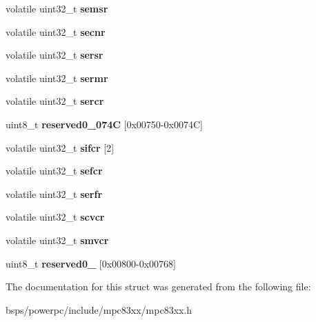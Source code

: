 \begin{DoxyCompactItemize}
\item 
\mbox{\label{structm83xxIPICRegisters___a4ea2216a6e029463eae7495b05f7444c}} 
volatile uint32\+\_\+t {\bfseries semsr}
\item 
\mbox{\label{structm83xxIPICRegisters___a445463156775d94b9c8c234b3010f554}} 
volatile uint32\+\_\+t {\bfseries secnr}
\item 
\mbox{\label{structm83xxIPICRegisters___ab09689a51e707d8c3449e7da9c155391}} 
volatile uint32\+\_\+t {\bfseries sersr}
\item 
\mbox{\label{structm83xxIPICRegisters___a3cffd1748448ec94c720c368ad074c4e}} 
volatile uint32\+\_\+t {\bfseries sermr}
\item 
\mbox{\label{structm83xxIPICRegisters___ac881321d563c5966c6115bad48a48e08}} 
volatile uint32\+\_\+t {\bfseries sercr}
\item 
\mbox{\label{structm83xxIPICRegisters___aaa1ff315ff9a6d1f2e5d919d3433c842}} 
uint8\+\_\+t {\bfseries reserved0\+\_\+074C} \mbox{[}0x00750-\/0x0074\+C\mbox{]}
\item 
\mbox{\label{structm83xxIPICRegisters___aade570ed86d0bee0fb642fcf3aa64f42}} 
volatile uint32\+\_\+t {\bfseries sifcr} \mbox{[}2\mbox{]}
\item 
\mbox{\label{structm83xxIPICRegisters___af73a3e9a906ee2a65129505bf3b52391}} 
volatile uint32\+\_\+t {\bfseries sefcr}
\item 
\mbox{\label{structm83xxIPICRegisters___ae5de2fd101fa52e528d441fb798f1792}} 
volatile uint32\+\_\+t {\bfseries serfr}
\item 
\mbox{\label{structm83xxIPICRegisters___a02b08669254951dddc49f41cbfd7aa09}} 
volatile uint32\+\_\+t {\bfseries scvcr}
\item 
\mbox{\label{structm83xxIPICRegisters___ab4fb6b33cfd705f62534fe718f668bd8}} 
volatile uint32\+\_\+t {\bfseries smvcr}
\item 
\mbox{\label{structm83xxIPICRegisters___aba3de5e111227b840397a379f8f5fd6c}} 
uint8\+\_\+t {\bfseries reserved0\+\_} \mbox{[}0x00800-\/0x00768\mbox{]}
\end{DoxyCompactItemize}


The documentation for this struct was generated from the following file\+:\begin{DoxyCompactItemize}
\item 
bsps/powerpc/include/mpc83xx/mpc83xx.\+h\end{DoxyCompactItemize}
